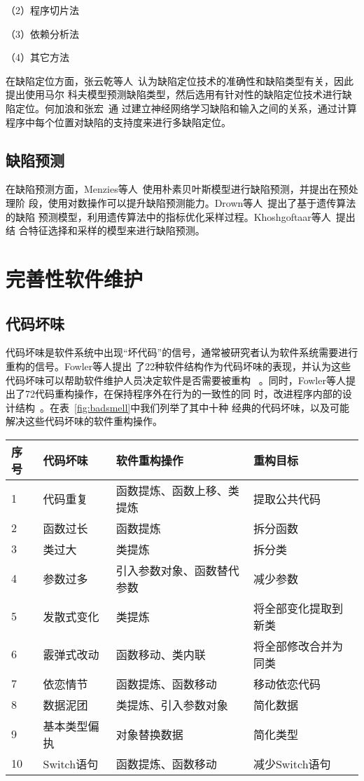（2）程序切片法


（3）依赖分析法

（4）其它方法

在缺陷定位方面，张云乾等人~\cite{malcov2013}认为缺陷定位技术的准确性和缺陷类型有关，因此提出使用马尔
科夫模型预测缺陷类型，然后选用有针对性的缺陷定位技术进行缺陷定位。何加浪和张宏~\cite{nnfault2013}通
过建立神经网络学习缺陷和输入之间的关系，通过计算程序中每个位置对缺陷的支持度来进行多缺陷定位。

\subsection{缺陷预测}

在缺陷预测方面，Menzies等人~\cite{menzies2007data}使用朴素贝叶斯模型进行缺陷预测，并提出在预处理阶
段，使用对数操作可以提升缺陷预测能力。Drown等人~\cite{drown2009evolutionary}提出了基于遗传算法的缺陷
预测模型，利用遗传算法中的指标优化采样过程。Khoshgoftaar等人~\cite{khoshgoftaar2010attribute}提出结
合特征选择和采样的模型来进行缺陷预测。
\section{完善性软件维护}

\subsection{代码坏味}
代码坏味是软件系统中出现``坏代码''的信号，通常被研究者认为软件系统需要进行重构的信号。Fowler等人提出
了22种软件结构作为代码坏味的表现，并认为这些代码坏味可以帮助软件维护人员决定软件是否需要被重构
~\cite{fowler1999refactoring}。同时，Fowler等人提出了72代码重构操作，在保持程序外在行为的一致性的同
时，改进程序内部的设计结构~\cite{fowler1999refactoring}。在表~\ref{fig:badsmell}中我们列举了其中十种
经典的代码坏味，以及可能解决这些代码坏味的软件重构操作。

\begin{center}
\label{fig:badsmell}
\begin{tabular}{|l|l|l|l|}
\hline
序号 & 代码坏味 & 软件重构操作 & 重构目标\\ \hline
1 & 代码重复 & 函数提炼、函数上移、类提炼 & 提取公共代码\\ \hline
2 & 函数过长 & 函数提炼 & 拆分函数\\ \hline
3 & 类过大 & 类提炼 & 拆分类\\ \hline
4 & 参数过多 & 引入参数对象、函数替代参数 & 减少参数\\ \hline
5 & 发散式变化& 类提炼 & 将全部变化提取到新类\\ \hline
6 & 霰弹式改动& 函数移动、类内联 & 将全部修改合并为同类\\ \hline
7 & 依恋情节& 函数提炼、函数移动 & 移动依恋代码\\ \hline
8 & 数据泥团& 类提炼、引入参数对象 & 简化数据\\ \hline
9 & 基本类型偏执& 对象替换数据 & 简化类型 \\ \hline
10 & Switch语句 & 函数提炼、函数移动 & 减少Switch语句\\ \hline
\end{tabular}
\end{center}


